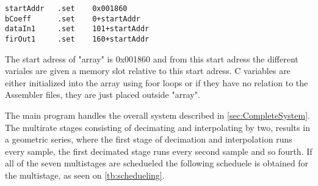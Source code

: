 \begin{lstlisting}[language={[x86masm]Assembler}, caption = {Adressing Assembler},label={listingAdressing}]
startAddr	.set	0x001860
bCoeff		.set	0+startAddr
dataIn1		.set	101+startAddr
firOut1		.set	160+startAddr
\end{lstlisting}

The start adress of "array" is 0x001860 and from this start adress the different variales are given a memory slot relative to this start adress. C variables are either initialized into the array using foor loops or if they have no relation to the Assembler files, they are just placed outside "array".

The main program handles the overall system described in \autoref{sec:CompleteSystem}. The multirate stages consisting of decimating and interpolating by two, results in a geometric series, where the first stage of decimation and interpolation runs every sample, the first decimated stage runs every second sample and so fourth. If all of the seven multistages are schedueled the following scheduele is obtained for the multistage, as seen on \autoref{tb:schedueling}.    



